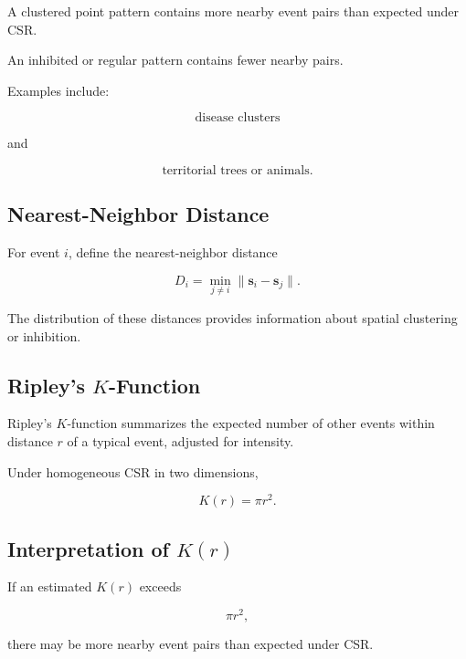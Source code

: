 A clustered point pattern contains more nearby event pairs than expected
under CSR.

An inhibited or regular pattern contains fewer nearby pairs.

Examples include:

\[
\boxed{
\text{disease clusters}
}
\]

and

\[
\boxed{
\text{territorial trees or animals}.
}
\]

\subsection{Nearest-Neighbor Distance}
\label{subsec:nearest-neighbor-distance}

For event \(i\), define the nearest-neighbor distance

\[
\boxed{
D_i
=
\min_{j\neq i}
\|
\mathbf{s}_i-\mathbf{s}_j
\|.
}
\]

The distribution of these distances provides information about spatial
clustering or inhibition.

\subsection{Ripley's \(K\)-Function}
\label{subsec:ripleys-k-function}

Ripley's \(K\)-function summarizes the expected number of other events
within distance \(r\) of a typical event, adjusted for intensity.

Under homogeneous CSR in two dimensions,

\[
\boxed{
K(r)
=
\pi r^2.
}
\]

\subsection{Interpretation of \(K(r)\)}
\label{subsec:ripleys-k-interpretation}

If an estimated \(K(r)\) exceeds

\[
\pi r^2,
\]

there may be more nearby event pairs than expected under CSR.

